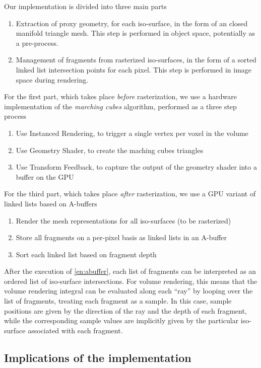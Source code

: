 \documentclass{egpubl}
\begin{document}
Our implementation is divided into three main parts
\begin{enumerate}[A]
\item Extraction of proxy geometry, for each iso-surface, in the form of an closed manifold triangle mesh. This step is performed in object space, potentially as a pre-process. \label{en:mcubes}
\item Management of fragments from rasterized iso-surfaces, in the form of a sorted linked list intersection points for each pixel. This step is performed in image space during rendering. \label{en:abuffer}
\end{enumerate}
For the first part, which takes place \emph{before} rasterization, we use a hardware implementation of the \emph{marching cubes} algorithm, performed as a three step process
\begin{enumerate}
\item Use Instanced Rendering, to trigger a single vertex per voxel in the volume
\item Use Geometry Shader, to create the maching cubes triangles
\item Use Transform Feedback, to capture the output of the geometry shader into a buffer on the GPU
\end{enumerate}
For the third part, which takes place \emph{after} rasterization, we use a GPU variant of linked lists based on A-buffers
\begin{enumerate}
\item {Render the mesh representations for all iso-surfaces (to be rasterized)}
\item Store all fragments on a per-pixel basis as linked lists in an A-buffer
\item Sort each linked list based on fragment depth \label{en:abuffer:sort}
\end{enumerate}
After the execution of \ref{en:abuffer}, each list of fragments can be interpreted as an ordered list of iso-surface intersections. For volume rendering, this means that the volume rendering integral can be evaluated along each ``ray'' by looping over the list of fragments, treating each fragment as a sample. In this case, sample positions are given by the direction of the ray and the depth of each fragment, while the corresponding  sample values are implicitly given by the particular iso-surface associated with each fragment.

\subsection*{Implications of the implementation}
\end{document}
